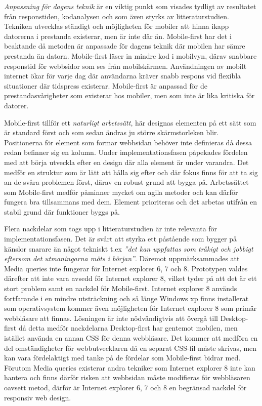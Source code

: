 \documentclass[11pt]{article}
\begin{document}
\textit{Anpassning för dagens teknik} är en viktig punkt som visades tydligt av resultatet från responstiden, kodanalysen och som även styrks av litteraturstudien. Tekniken utvecklas ständigt och möjligheten för mobiler att hinna ikapp datorerna i prestanda existerar, men är inte där än. Mobile-first har det i beaktande då metoden är anpassade för dagens teknik där mobilen har sämre prestanda än datorn. Mobile-first läser in mindre kod i mobilvyn, därav snabbare responstid för webbsidor som ses från mobilskärmen. Användningen av mobilt internet ökar för varje dag där användarna kräver snabb respons vid flexibla situationer där tidspress existerar. Mobile-first är anpassad för de prestandasvårigheter som existerar hos mobiler, men som inte är lika kritiska för datorer. 

Mobile-first tillför ett \textit{naturligt arbetssätt}, här designas elementen på ett sätt som är standard först och som sedan ändras ju större skärmstorleken blir. Positionerna för element som formar webbsidan behöver inte definieras då dessa redan befinner sig en kolumn. Under implementationsfasen påpekades fördelen med att börja utveckla efter en design där alla element är under varandra. Det medför en struktur som är lätt att hålla sig efter och där fokus finns för att ta sig an de svåra problemen först, därav en robust grund att bygga på. Arbetssättet som Mobile-first medför påminner mycket om agila metoder och kan därför fungera bra tillsammans med dem. Element prioriteras och det arbetas utifrån en stabil grund där funktioner byggs på.

Flera nackdelar som togs upp i litteraturstudien är inte relevanta för implementationsfasen. Det är svårt att styrka ett påstående som bygger på känslor snarare än något tekniskt t.ex \textit{”det kan uppfattas som tråkigt och jobbigt eftersom det utmaningarna möts i början”}. Däremot uppmärksammades att Media queries inte fungerar för Internet explorer 6, 7 och 8. Prototypen valdes därefter att inte vara avsedd för Internet explorer 8, vilket tyder på att det är ett stort problem samt en nackdel för Mobile-first. Internet explorer 8 används fortfarande i en mindre utsträckning och så länge Windows xp finns installerat som operativsystem kommer även möjligheten för Internet explorer 8 som primär webbläsare att finnas. Lösningen är inte nödvändigtvis att övergå till Desktop-first då detta medför nackdelarna Desktop-first har gentemot mobilen, men istället använda en annan CSS för denna webbläsare. Det kommer att medföra en del omständigheter för webbutvecklaren då en separat CSS-fil måste skrivas, men kan vara fördelaktigt med tanke på de fördelar som Mobile-first bidrar med. Förutom Media queries existerar andra tekniker som Internet explorer 8 inte kan hantera och finns därför risken att webbsidan måste modifieras för webbläsaren oavsett metod, därför är Internet explorer 6, 7 och 8 en begränsad nackdel för responsiv web design.
\end{document}

